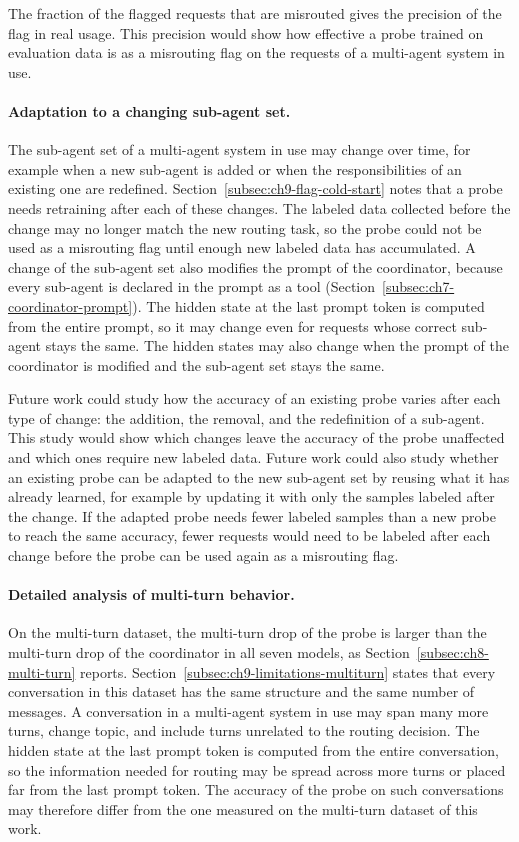 The fraction of the flagged requests that are misrouted gives the precision of the flag in real usage. This precision would show how effective a probe trained on evaluation data is as a misrouting flag on the requests of a multi-agent system in use.

\paragraph{Adaptation to a changing sub-agent set.} The sub-agent set of a multi-agent system in use may change over time, for example when a new sub-agent is added or when the responsibilities of an existing one are redefined. Section~\ref{subsec:ch9-flag-cold-start} notes that a probe needs retraining after each of these changes. The labeled data collected before the change may no longer match the new routing task, so the probe could not be used as a misrouting flag until enough new labeled data has accumulated. A change of the sub-agent set also modifies the prompt of the coordinator, because every sub-agent is declared in the prompt as a tool (Section~\ref{subsec:ch7-coordinator-prompt}). The hidden state at the last prompt token is computed from the entire prompt, so it may change even for requests whose correct sub-agent stays the same. The hidden states may also change when the prompt of the coordinator is modified and the sub-agent set stays the same.

Future work could study how the accuracy of an existing probe varies after each type of change: the addition, the removal, and the redefinition of a sub-agent. This study would show which changes leave the accuracy of the probe unaffected and which ones require new labeled data. Future work could also study whether an existing probe can be adapted to the new sub-agent set by reusing what it has already learned, for example by updating it with only the samples labeled after the change. If the adapted probe needs fewer labeled samples than a new probe to reach the same accuracy, fewer requests would need to be labeled after each change before the probe can be used again as a misrouting flag.

\paragraph{Detailed analysis of multi-turn behavior.} On the multi-turn dataset, the multi-turn drop of the probe is larger than the multi-turn drop of the coordinator in all seven models, as Section~\ref{subsec:ch8-multi-turn} reports. Section~\ref{subsec:ch9-limitations-multiturn} states that every conversation in this dataset has the same structure and the same number of messages. A conversation in a multi-agent system in use may span many more turns, change topic, and include turns unrelated to the routing decision. The hidden state at the last prompt token is computed from the entire conversation, so the information needed for routing may be spread across more turns or placed far from the last prompt token. The accuracy of the probe on such conversations may therefore differ from the one measured on the multi-turn dataset of this work.

